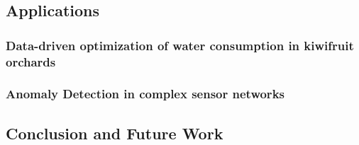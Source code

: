 \documentclass[12pt,a4paper,openright,twoside]{book}
\begin{document}

\chapter{Applications}
\label{chap:applications}

\section{Data-driven optimization of water consumption in kiwifruit orchards}
\label{sec:smarter}

\section{Anomaly Detection in complex sensor networks}
\label{sec:s2g}


\begin{epilogue}
\chapter{Conclusion and Future Work}
\label{chap:conclusion}

\end{epilogue}

\backmatter

\part*{}

\nocite{*} %


\end{document}

